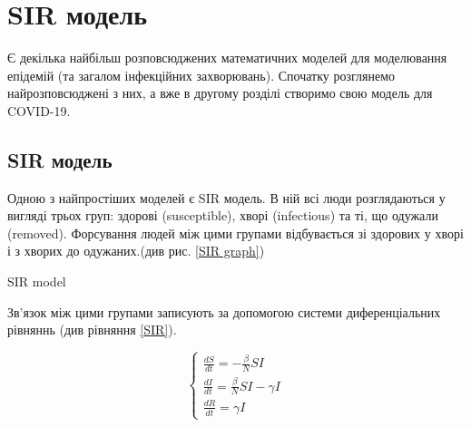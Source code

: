 \chapter{SIR модель}
Є декілька найбільш розповсюджених математичних моделей для моделювання епідемій (та загалом інфекційних захворювань).
Спочатку розглянемо найрозповсюджені з них, а вже в другому розділі
створимо свою модель для COVID-19.

\section{SIR модель}
\par Одною з найпростіших моделей є SIR модель. 
В ній всі люди розглядаються у вигляді трьох груп: здорові (susceptible), хворі (infectious) та ті, що одужали (removed). 
Форсування людей між цими групами відбувається зі здорових у хворі 
і з хворих до одужаних.(див рис. \ref{SIR graph})  

\vspace{1cm}
\begin{risunok}[ht]
    \centering
    \vspace{0.5cm}
    \caption{SIR model}
    \label{SIR graph}
\end{risunok}

Зв’язок між цими групами записують за допомогою системи диференціальних рівняннь (див рівняння \ref{SIR}).

\begin{equation}
    \begin{cases}
        \frac{dS}{dt} = - \frac{\beta}{N}SI          \\
        \frac{dI}{dt} = \frac{\beta}{N}SI - \gamma I \\
        \frac{dR}{dt} = \gamma I
    \end{cases}
\end{equation}
\label{SIR}


